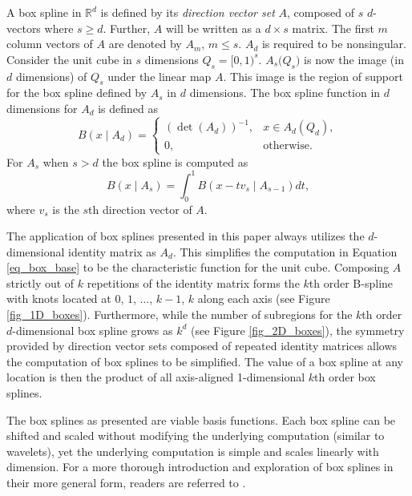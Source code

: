 A box spline in $\mathbb{R}^d$ is defined by its \textit{direction vector set} $A$, composed of $s$ $d$-vectors where $s \geq d$. Further, $A$ will be written as a $d \times s$ matrix. The first $m$ column vectors of $A$ are denoted by $A_m$, $m \leq s$. $A_d$ is required to be nonsingular. Consider the unit cube in $s$ dimensions $Q_s = [0,1)^s$. $A_s \bigl( Q_s \bigr)$ is now the image (in $d$ dimensions) of $Q_s$ under the linear map $A$. This image is the region of support for the box spline defined by $A_s$ in $d$ dimensions. The box spline function in $d$ dimensions for $A_d$ is defined as
\begin{equation}
B(x \mid A_d) = \begin{cases} 
(\det(A_d))^{-1}, & x \in A_d(Q_d), \\
0,                & \text{otherwise.}
\end{cases}
\label{eq_box_base}
\end{equation}
For $A_s$ when $s > d$ the box spline is computed as
\begin{equation}
B(x \mid A_s) = \int_0^1 B(x - t v_s \mid A_{s-1}) dt,
\label{eq_box_recursive}
\end{equation}
where $v_s$ is the $s$th direction vector of $A$.

The application of box splines presented in this paper always utilizes the $d$-dimensional identity matrix as $A_d$. This simplifies the computation in Equation \ref{eq_box_base} to be the characteristic function for the unit cube. Composing $A$ strictly out of $k$ repetitions of the identity matrix forms the $k$th order B-spline with knots located at $0$, $1$, $\ldots$, $k-1$, $k$ along each axis (see Figure \ref{fig_1D_boxes}). Furthermore, while the number of subregions for the $k$th order $d$-dimensional box spline grows as $k^d$ (see Figure \ref{fig_2D_boxes}), the symmetry provided by direction vector sets composed of repeated identity matrices allows the computation of box splines to be simplified. The value of a box spline at any location is then the product of all axis-aligned 1-dimensional $k$th order box splines.

The box splines as presented are viable basis functions. Each box spline can be shifted and scaled without modifying the underlying computation (similar to wavelets), yet the underlying computation is simple and scales linearly with dimension. For a more thorough introduction and exploration of box splines in their more general form, readers are referred to \cite{de2013box}. 

